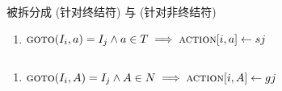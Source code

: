 \begin{frame}{}
  \begin{center}

    \vspace{0.30cm}
  \end{center}
\end{frame}

\begin{frame}{}
  \begin{center}

    \begin{columns}
        
    \end{columns}

    \vspace{0.20cm}
    被拆分成  {\small (针对终结符)}
    与  {\small (针对非终结符)}
  \end{center}
\end{frame}

\begin{frame}{}
  \begin{center}
    \begin{enumerate}[(1)]
      \centering
      \item $\textsc{goto}(I_{i}, a) = I_{j} \land a \in T \implies \textsc{action}[i, a] \gets sj$
    \end{enumerate}

    \begin{columns}
        
    \end{columns}

    \vspace{0.20cm}
    \begin{enumerate}[(2)]
      \centering
      \item $\textsc{goto}(I_{i}, A) = I_{j} \land A \in N \implies \textsc{action}[i, A] \gets gj$
    \end{enumerate}
  \end{center}
\end{frame}


